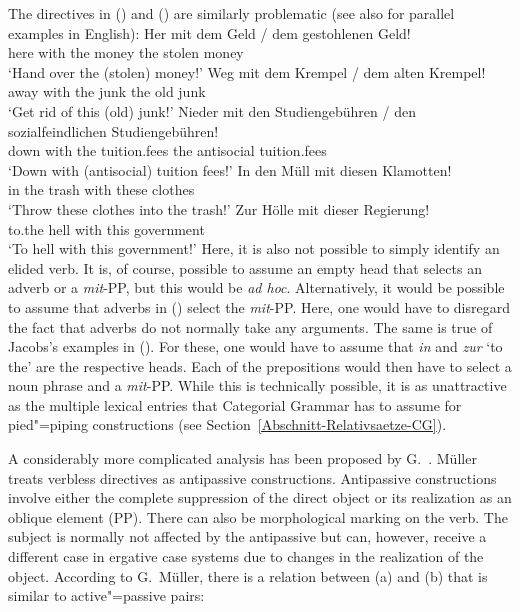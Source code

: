 \begin{exe}
\begin{xlist}[iv.]
\begin{exe}
\begin{xlist}[iv.]
The directives in () and () are similarly problematic (see also  for parallel examples in English):
\eal
\label{Beispiel-Direktiva}
\ex 
\gll Her  mit  dem Geld   / dem gestohlenen Geld!\\
     here with the money {} the stolen money\\
\glt `Hand over the (stolen) money!'
\ex 
\gll Weg  mit  dem Krempel / dem alten Krempel!\\
     away with the junk   {} the old junk\\
\glt `Get rid of this (old) junk!'
\ex 
\gll Nieder mit den Studiengebühren / den sozialfeindlichen Studiengebühren!\\
     down with the tuition.fees  {} the antisocial tuition.fees\\
\glt `Down with (antisocial) tuition fees!'
\zl
\eal
\ex 
\gll In den Müll mit diesen Klamotten!\\
     in the trash with these clothes\\
\glt `Throw these clothes into the trash!'
\ex 
\gll Zur Hölle mit dieser Regierung!\\
	 to.the hell with this government\\
\glt `To hell with this government!'
\zl
Here, it is also not possible to simply identify an
elided verb. It is, of course, possible to assume an empty head that selects an adverb or a 
\emph{mit}-PP, but this would be \emph{ad hoc}.
Alternatively, it would be possible to assume that adverbs in () select the \emph{mit}-PP. Here, one would have to disregard the fact that adverbs
do not normally take any arguments. The same is true of Jacobs's examples in (). For these,
one would have to assume that \emph{in} and \emph{zur} `to the' are the respective heads. Each of
the prepositions would then have to select a noun phrase and a \emph{mit}-PP. While this is technically possible, it is as unattractive
as the multiple lexical entries that Categorial Grammar has to assume for pied"=piping constructions (see Section~\ref{Abschnitt-Relativsaetze-CG}). 

A considerably more complicated analysis has been proposed by G.\ \citet{GMueller2009a}. Müller treats verbless directives as antipassive constructions. 
Antipassive constructions involve either the complete suppression of the direct object or its realization as an oblique element (PP). There
can also be morphological marking on the verb. The subject is normally not affected by the antipassive but can, however, receive a different case
in ergative case systems due to changes in the realization of the object. According to
G.\ Müller, there is a relation between (a) and (b) that is similar to active"=passive pairs:


\end{xlist}
\end{exe}
\end{xlist}
\end{exe}
